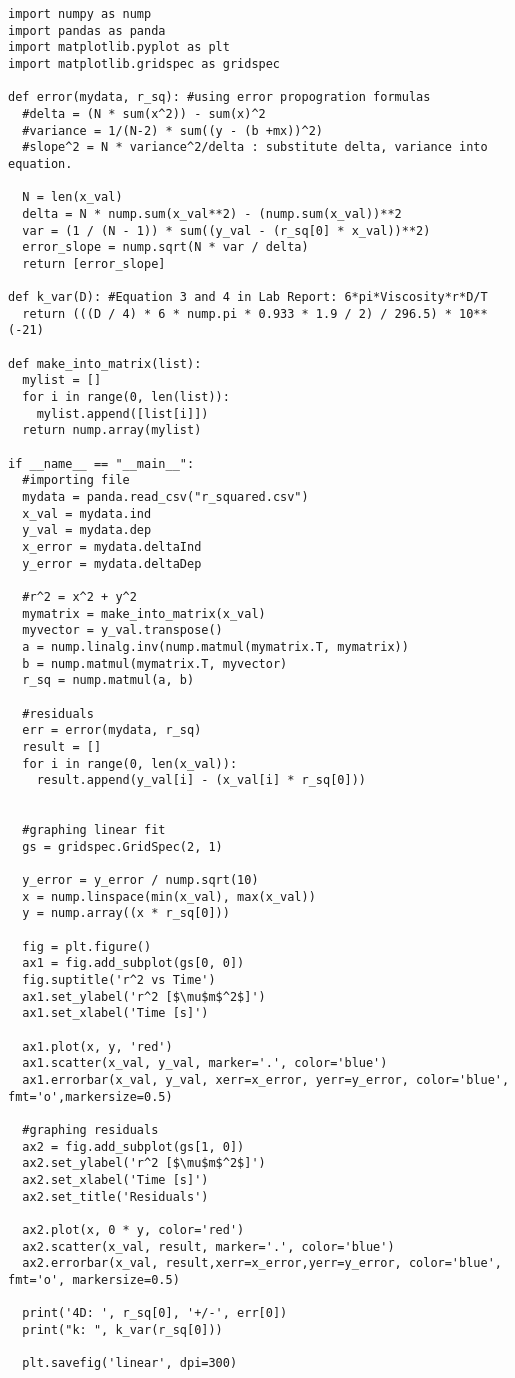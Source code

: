 \documentclass[12pt, letterpaper, twoside]{article}
\begin{document}
\begin{verbatim}
import numpy as nump
import pandas as panda
import matplotlib.pyplot as plt
import matplotlib.gridspec as gridspec

def error(mydata, r_sq): #using error propogration formulas 
  #delta = (N * sum(x^2)) - sum(x)^2
  #variance = 1/(N-2) * sum((y - (b +mx))^2)
  #slope^2 = N * variance^2/delta : substitute delta, variance into equation.
  
  N = len(x_val)
  delta = N * nump.sum(x_val**2) - (nump.sum(x_val))**2
  var = (1 / (N - 1)) * sum((y_val - (r_sq[0] * x_val))**2)
  error_slope = nump.sqrt(N * var / delta)
  return [error_slope]

def k_var(D): #Equation 3 and 4 in Lab Report: 6*pi*Viscosity*r*D/T
  return (((D / 4) * 6 * nump.pi * 0.933 * 1.9 / 2) / 296.5) * 10**(-21)

def make_into_matrix(list):
  mylist = []
  for i in range(0, len(list)):
    mylist.append([list[i]])
  return nump.array(mylist) 

if __name__ == "__main__":
  #importing file
  mydata = panda.read_csv("r_squared.csv")
  x_val = mydata.ind
  y_val = mydata.dep
  x_error = mydata.deltaInd
  y_error = mydata.deltaDep

  #r^2 = x^2 + y^2
  mymatrix = make_into_matrix(x_val)
  myvector = y_val.transpose()
  a = nump.linalg.inv(nump.matmul(mymatrix.T, mymatrix))
  b = nump.matmul(mymatrix.T, myvector)
  r_sq = nump.matmul(a, b)

  #residuals 
  err = error(mydata, r_sq)
  result = []
  for i in range(0, len(x_val)):
    result.append(y_val[i] - (x_val[i] * r_sq[0]))

  
  #graphing linear fit 
  gs = gridspec.GridSpec(2, 1)
    
  y_error = y_error / nump.sqrt(10) 
  x = nump.linspace(min(x_val), max(x_val))
  y = nump.array((x * r_sq[0]))
  
  fig = plt.figure()
  ax1 = fig.add_subplot(gs[0, 0])
  fig.suptitle('r^2 vs Time')
  ax1.set_ylabel('r^2 [$\mu$m$^2$]')
  ax1.set_xlabel('Time [s]')
  
  ax1.plot(x, y, 'red')
  ax1.scatter(x_val, y_val, marker='.', color='blue')
  ax1.errorbar(x_val, y_val, xerr=x_error, yerr=y_error, color='blue', fmt='o',markersize=0.5)
    
  #graphing residuals
  ax2 = fig.add_subplot(gs[1, 0])
  ax2.set_ylabel('r^2 [$\mu$m$^2$]')
  ax2.set_xlabel('Time [s]')
  ax2.set_title('Residuals')
  
  ax2.plot(x, 0 * y, color='red')
  ax2.scatter(x_val, result, marker='.', color='blue')
  ax2.errorbar(x_val, result,xerr=x_error,yerr=y_error, color='blue', fmt='o', markersize=0.5)

  print('4D: ', r_sq[0], '+/-', err[0])
  print("k: ", k_var(r_sq[0]))

  plt.savefig('linear', dpi=300)
\end{verbatim}
\end{document}
